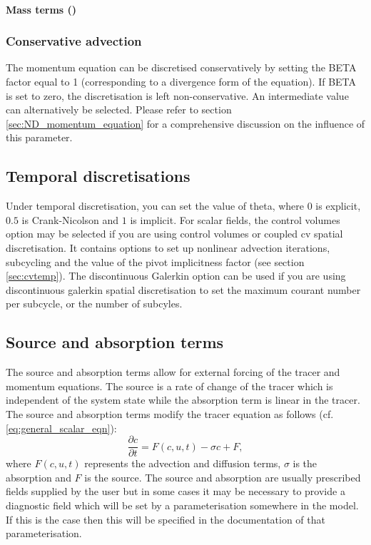\paragraph{Mass terms ()}

\subsubsection{Conservative advection}

The momentum equation can be discretised conservatively by setting the
BETA factor equal to 1 (corresponding to a divergence form of the
equation). If BETA is set to zero, the discretisation is left
non-conservative. An intermediate value can alternatively be
selected. Please refer to section \ref{sec:ND_momentum_equation} for a comprehensive discussion on the influence of this parameter.


\subsection{Temporal discretisations}
\label{sec:configuring_fluidity_temporal_discretisation}
Under temporal discretisation, you can set the value of theta, where $0$ is explicit, $0.5$ is Crank-Nicolson and $1$ is implicit. For scalar fields, the control volumes option may be selected if you are using control volumes or coupled cv spatial discretisation.  It contains options to set up nonlinear advection iterations, subcycling and the value of the pivot implicitness factor (see section \ref{sec:cvtemp}). The discontinuous Galerkin option can be used if you are using discontinuous galerkin spatial discretisation to set the maximum courant number per subcycle, or the number of subcyles. 

\subsection{Source and absorption terms}\label{sec:Source}

The source and absorption terms allow for external forcing of the tracer and
momentum equations. The source is a rate of change of the tracer which is
independent of the system state while the absorption term is linear in the
tracer. The source and absorption terms modify the tracer
equation as follows (cf. \eqref{eq:general_scalar_eqn}):
\begin{equation}
  \frac{\partial c}{\partial t} = F(c,u,t) - \sigma c + F,
\end{equation}
where $F(c,u,t)$ represents the advection and diffusion terms, $\sigma$ is the
absorption and $F$ is the source. The source and absorption are usually
prescribed fields supplied by the user but in some cases it may be necessary
to provide a diagnostic field which will be set by a parameterisation
somewhere in the model. If this is the case then this will be specified in
the documentation of that parameterisation.

